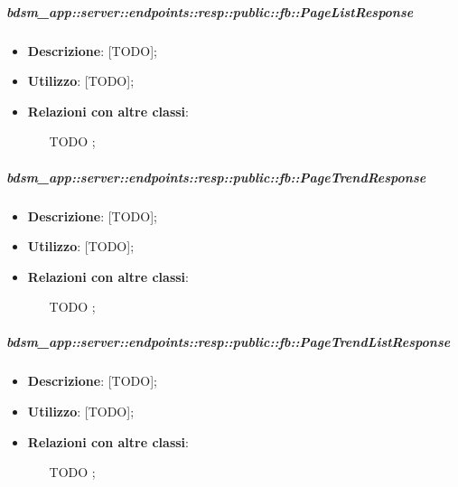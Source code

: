    \subparagraph{bdsm\_app::server::endpoints::resp::public::fb::PageListResponse} %
    \label{subp:bdsm_app_server_endpoints_resp_public_fb_pagelistresponse}
    \begin{itemize}
      \item \textbf{Descrizione}: [TODO];
      \item \textbf{Utilizzo}: [TODO];
      \item \textbf{Relazioni con altre classi}:
        \begin{itemize}
          \item [TODO];
        \end{itemize}
      \end{itemize}
    
    \subparagraph{bdsm\_app::server::endpoints::resp::public::fb::PageTrendResponse} %
    \label{subp:bdsm_app_server_endpoints_resp_public_fb_pagetrendresponse}
    \begin{itemize}
      \item \textbf{Descrizione}: [TODO];
      \item \textbf{Utilizzo}: [TODO];
      \item \textbf{Relazioni con altre classi}:
        \begin{itemize}
          \item [TODO];
        \end{itemize}
      \end{itemize}
    
    \subparagraph{bdsm\_app::server::endpoints::resp::public::fb::PageTrendListResponse} %
    \label{subp:bdsm_app_server_endpoints_resp_public_fb_pagetrendlistresponse}
    \begin{itemize}
      \item \textbf{Descrizione}: [TODO];
      \item \textbf{Utilizzo}: [TODO];
      \item \textbf{Relazioni con altre classi}:
        \begin{itemize}
          \item [TODO];
        \end{itemize}
      \end{itemize}
    
